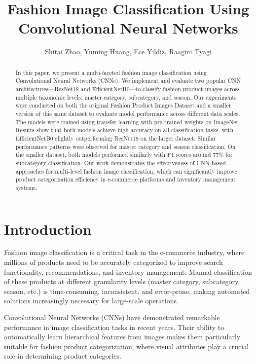 \documentclass[10pt,journal,compsoc]{IEEEtran}
\begin{document}
\title{Fashion Image Classification Using Convolutional Neural Networks}

\author{Shitai Zhao, Yuming Huang, Ece Yildiz, Raagini Tyagi}

\maketitle

\begin{abstract}
In this paper, we present a multi-faceted fashion image classification using Convolutional Neural Networks (CNNs). We implement and evaluate two popular CNN architectures---ResNet18 and EfficientNetB0---to classify fashion product images across multiple taxonomic levels: master category, subcategory, and season. Our experiments were conducted on both the original Fashion Product Images Dataset and a smaller version of this same dataset to evaluate model performance across different data scales. The models were trained using transfer learning with pre-trained weights on ImageNet. Results show that both models achieve high accuracy on all classification tasks, with EfficientNetB0 slightly outperforming ResNet18 on the larger dataset. Similar performance patterns were observed for master category and season classification. On the smaller dataset, both models performed similarly with F1 scores around 77\% for subcategory classification. Our work demonstrates the effectiveness of CNN-based approaches for multi-level fashion image classification, which can significantly improve product categorization efficiency in e-commerce platforms and inventory management systems.
\end{abstract}

\section{Introduction}
Fashion image classification is a critical task in the e-commerce industry, where millions of products need to be accurately categorized to improve search functionality, recommendations, and inventory management. Manual classification of these products at different granularity levels (master category, subcategory, season, etc.) is time-consuming, inconsistent, and error-prone, making automated solutions increasingly necessary for large-scale operations.

Convolutional Neural Networks (CNNs) have demonstrated remarkable performance in image classification tasks in recent years. Their ability to automatically learn hierarchical features from images makes them particularly suitable for fashion product categorization, where visual attributes play a crucial role in determining product categories.
\end{document}
